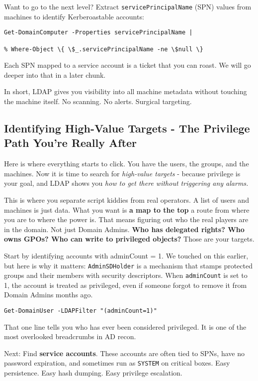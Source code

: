 Want to go to the next level? Extract \texttt{servicePrincipalName} (SPN) values from machines to identify Kerberoastable accounts:
\begin{verbatim}
Get-DomainComputer -Properties servicePrincipalName |

% Where-Object \{ \$_.servicePrincipalName -ne \$null \}
\end{verbatim}
Each SPN mapped to a service account is a ticket that you can roast. We will go deeper into that in a later chunk.

In short, LDAP gives you visibility into all machine metadata without touching the machine itself. No scanning. No alerts. Surgical targeting.

\subsection{\textbf{Identifying High-Value Targets - The Privilege Path You’re Really After}
}
Here is where everything starts to click. You have the users, the groups, and the machines. Now it is time to search for \textit{ high-value targets} - because privilege is your goal, and LDAP shows you \textit{how to get there without triggering any alarms.}

This is where you separate script kiddies from real operators. A list of users and machines is just data. What you want is \textbf{a map to the top} a route from where you are to where the power is. That means figuring out who the real players are in the domain. Not just Domain Admins. \textbf{Who has delegated rights? Who owns GPOs? Who can write to privileged objects?} Those are your targets.

Start by identifying accounts with adminCount = 1. We touched on this earlier, but here is why it matters: \texttt{AdminSDHolder} is a mechanism that stamps protected groups and their members with security descriptors. When \texttt{adminCount} is set to 1, the account is treated as privileged, even if someone forgot to remove it from Domain Admins months ago.
\begin{verbatim}
Get-DomainUser -LDAPFilter "(adminCount=1)"
\end{verbatim}
That one line tells you who has ever been considered privileged. It is one of the most overlooked breadcrumbs in AD recon.

Next: Find \textbf{ service accounts}. These accounts are often tied to SPNs, have no password expiration, and sometimes run as \texttt{SYSTEM} on critical boxes. Easy persistence. Easy hash dumping. Easy privilege escalation.


